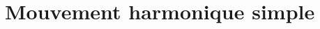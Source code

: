\section{Mouvement harmonique simple}
\vspace{-2\baselineskip}
\begin{center}
    
\end{center}



%     


